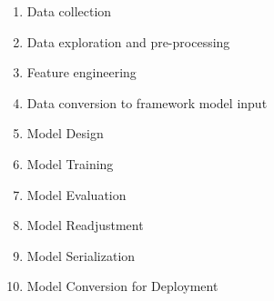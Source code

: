 \begin{enumerate}
    \item Data collection
    \item Data exploration and pre-processing
    \item Feature engineering
    \item Data conversion to framework model input
    \item Model Design
    \item Model Training
    \item Model Evaluation
    \item Model Readjustment
    \item Model Serialization
    \item Model Conversion for Deployment
\end{enumerate}

\newpage
\clearpage